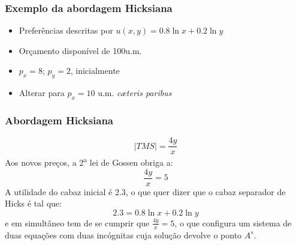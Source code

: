 \begin{frame}
\begin{center}
	\end{center}
\end{frame}

\begin{frame}
	\frametitle{Exemplo da abordagem Hicksiana}
	\begin{itemize}
		\item Prefer\^encias descritas por $u(x,y)=0.8 \ln x + 0.2 \ln y$
		\item Or\c camento dispon\'ivel de 100u.m.
		\item $p_x=8$; $p_y=2$, inicialmente
		\item Alterar para $p_x=10$ u.m. \emph{c\ae teris paribus}
	\end{itemize}
\end{frame}

\begin{frame}
	\frametitle{Abordagem Hicksiana}
	\[|TMS|=\frac{4y}{x}\]
	Aos novos pre\c cos, a 2\textsuperscript{a} lei de Gossen obriga a:\\
	\[\frac{4y}{x}=5\]
	A  utilidade do cabaz inicial \'e 2.3, o que quer dizer que o cabaz separador de Hicks \'e tal que: \[2.3 = 0.8\ln{x}+0.2\ln{y}\] e em simult\^aneo tem de se cumprir que \(\frac{4y}{x}=5\), o que configura um sistema de duas equa\c c\~oes com duas inc\'ognitas cuja solu\c c\~ao devolve o ponto $A^s$.
\end{frame}

